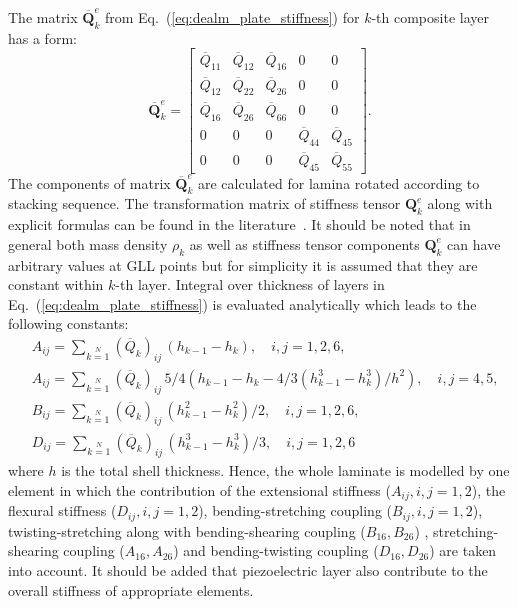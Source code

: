 \documentclass[preprint,12pt]{elsarticle}
\renewcommand{\bm}[1]{\mathbf{#1}}
\begin{document}
	The matrix $\bm{\overline Q}_k^e$ from Eq.~(\ref{eq:dealm_plate_stiffness}) for $k$-th composite layer has a form:
	\begin{equation}
	\bm{\overline Q}_k^e = \left[\begin{array}{ccccc} \overline{Q}_{11} & \overline{Q}_{12}& \overline{Q}_{16} & 0&0\\[2pt]
	\overline{Q}_{12}& \overline{Q}_{22} & \overline{Q}_{26}& 0&0\\\overline{Q}_{16}&\overline{Q}_{26}&\overline{Q}_{66}&0&0\\[2pt]
	0& 0 &0&\overline{Q}_{44}& \overline{Q}_{45}\\[2pt]
	0&0&0&\overline{Q}_{45}&\overline{Q}_{55}\end{array}\right].  \label{eq:dealm_plate_stf}
	\end{equation}
	The components of matrix $\bm{\overline Q}_k^e$ are calculated for lamina rotated according to stacking sequence. The transformation matrix of stiffness tensor $\bm{Q}_k^e$ along with explicit formulas can be found in the literature~\cite{Vinson1987}.
	It should be noted that in general both mass density $\rho_k$ as well as stiffness tensor components $\bm{Q}_k^e$ can have arbitrary values at GLL points but for simplicity it is assumed that they are constant within $k$-th layer. Integral over thickness of layers in Eq.~(\ref{eq:dealm_plate_stiffness}) is evaluated analytically which leads to the following constants:
	\begin{equation}
	\begin{split}
	& A_{ij} =  \sum \limits_{k=1}\limits^{N} (\overline{Q}_k)_{ij} \,(h_{k-1} - h_k),\quad i,j = 1,2,6,\\
	& A_{ij} =  \sum \limits_{k=1}\limits^{N} (\overline{Q}_k)_{ij} \,5/4 (h_{k-1} - h_k - 4/3 (h_{k-1}^3 - h_k^3)/h^2 ),\quad i,j = 4,5,\\
	& B_{ij} = \sum \limits_{k=1}\limits^{N}(\overline{Q}_k)_{ij} \,(h_{k-1}^2 - h_k^2)/2, \quad i,j = 1,2,6,\\
	& D_{ij} = \sum \limits_{k=1}\limits^{N}(\overline{Q}_k)_{ij} \,(h_{k-1}^3 - h_k^3)/3, \quad i,j = 1,2,6
	\end{split}
	\label{eq:stiffness_contribution}
	\end{equation}
	where $h$ is the total shell thickness. Hence, the whole laminate is modelled by one element in which the contribution of the extensional stiffness ($A_{ij}, i,j = 1,2$), the flexural stiffness ($D_{ij}, i,j = 1,2$), bending-stretching coupling  ($B_{ij}, i,j = 1,2$), twisting-stretching along with bending-shearing coupling ($B_{16}, B_{26}$) , stretching-shearing coupling ($A_{16}, A_{26}$) and bending-twisting coupling ($D_{16}, D_{26}$) are taken into account. It should be added that piezoelectric layer also contribute to the overall stiffness of appropriate elements. 
	\vspace{0.5cm}
\end{document}
